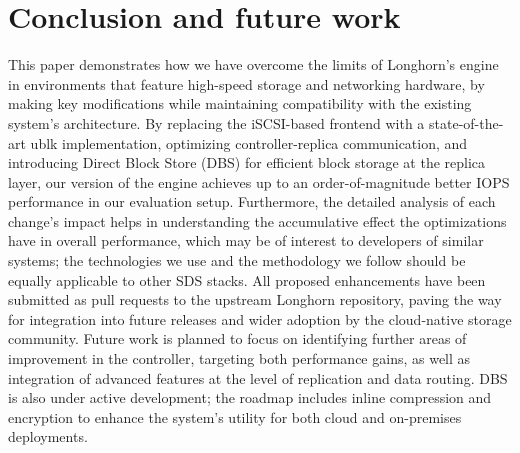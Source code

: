 \section{Conclusion and future work}

This paper demonstrates how we have overcome the limits of Longhorn’s engine in environments that feature high-speed storage and networking hardware, by making key modifications while maintaining compatibility with the existing system's architecture. By replacing the iSCSI-based frontend with a state-of-the-art ublk implementation, optimizing controller-replica communication, and introducing Direct Block Store (DBS) for efficient block storage at the replica layer, our version of the engine achieves up to an order-of-magnitude better IOPS performance in our evaluation setup.
Furthermore, the detailed analysis of each change's impact helps in understanding the accumulative effect the optimizations have in overall performance, which may be of interest to developers of similar systems; the technologies we use and the methodology we follow should be equally applicable to other SDS stacks.
All proposed enhancements have been submitted as pull requests to the upstream Longhorn repository, paving the way for integration into future releases and wider adoption by the cloud-native storage community.
Future work is planned to focus on identifying further areas of improvement in the controller, targeting both performance gains, as well as integration of advanced features at the level of replication and data routing.
DBS is also under active development; the roadmap includes inline compression and encryption to enhance the system’s utility for both cloud and on-premises deployments.
